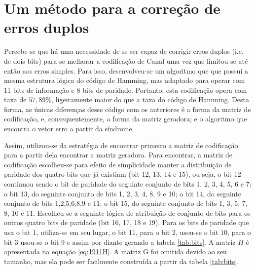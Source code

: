 \documentclass[journal,comsoc]{IEEEtran}
\begin{document}
	\section{Um método para a correção de erros duplos}
		Percebe-se que há uma necessidade de se ser capaz de corrigir erros duplos (i.e. de dois bits) para se melhorar a codificação de Canal uma vez que limitou-se até então aos erros simples. Para isso, desenvolveu-se um algoritmo que que possui a mesma estrutura lógica do código de Hamming, mas adaptado para operar com 11 bits de informação e 8 bits de paridade. Portanto, esta codificação opera com taxa de $57,89\%$, ligeiramente maior  do que a taxa do código de Hamming. Desta forma, as únicas diferenças desse código com os anteriores é a forma da matriz de codificação, e, consequentemente, a forma da matriz geradora; e o algoritmo que encontra o vetor erro a	partir da síndrome.
	
		Assim, utilizou-se da estratégia de encontrar primeiro a matriz de codificação para a partir dela encontrar a matriz geradora. Para encontrar, a matriz de codificação escolheu-se para efeito de simplicidade manter a distribuição de paridade dos quatro bits que já existiam (bit 12, 13, 14 e 15), ou seja, o bit 12 continuou sendo o bit de paridade do seguinte conjunto de bits 1, 2, 3, 4, 5, 6 e 7; o bit 13, do seguinte conjunto de bits 1, 2, 3, 4, 8, 9 e 10; o bit 14, do seguinte conjunto de bits 1,2,5,6,8,9 e 11; o bit 15, do seguinte conjunto de bits 1, 3, 5, 7, 8, 10 e 11. Escolheu-se a seguinte lógica de atribuição de conjunto de bits para os outros quatro bits de paridade (bit 16, 17, 18 e 19). Para os bits de paridade que usa o bit 1, utiliza-se em seu lugar, o bit 11, para o bit 2, usou-se o bit 10, para o bit 3 usou-se o bit 9 e assim por diante gerando a tabela \ref{tab:bits}. A matriz $H$ é apresentada na equação \ref{eq:1911H}. A matriz G foi omitida devido ao seu tamanho, mas ela pode ser facilmente construída a partir da tabela \ref{tab:bits}.
		
\end{document}
